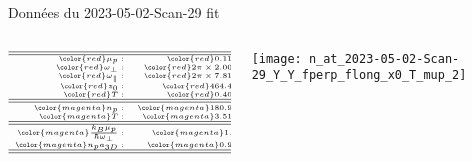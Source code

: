 \begin{frame}[shrink=1]{Données du 2023-05-02-Scan-29  fit }
{\begin{columns}
		\begin{column}{0.3\linewidth}
			$$ 
			{\tiny
			\begin{array}{rrl}
				\hline
				\hline
				{\color{red} \mu_p:}  & {\color{red} 0.115}  & {\color{red} \mu K}\\
				{\color{red}\omega_\perp : } & {\color{red} 2 \pi  \times  2.000} & {\color{red}kHz	}\\
				{\color{red} \omega_\parallel :}  & {\color{red} 2 \pi  \times 7.815}  & {\color{red} Hz	}\\
				{\color{red} z_0 : } & {\color{red} 464.43}& {\color{red} \mu m	} \\
				{\color{red} T : } & {\color{red} 0.405  } & {\color{red} \mu K}\\			
				\hline
				\hline
				{\color{magenta} n_p :   }& {\color{magenta} 180.90}  & {\color{magenta} {\mu m}^{-1}} \\	
				{\color{magenta} T : } & {\color{magenta} 3.519} & {\color{magenta}\mu_p} \\				
				\hline
				\hline	
				{\color{magenta} \frac{ k_B \mu_p}{\hbar \omega_\perp } : } & {\color{magenta} 1.2}  & 	\\
				{\color{magenta} n_p a_{3D} : }  & {\color{magenta} 0.96}  &  \\
				\hline
				\hline	
			\end{array}
			}
			$$


		\end{column}
		
		\begin{column}{0.7\linewidth}
			\centering
			\texttt{[image: n\_at\_2023-05-02-Scan-29\_Y\_Y\_fperp\_flong\_x0\_T\_mup\_2]}		
		\end{column}

		
	\end{columns}
		
	}
	
\end{frame}

